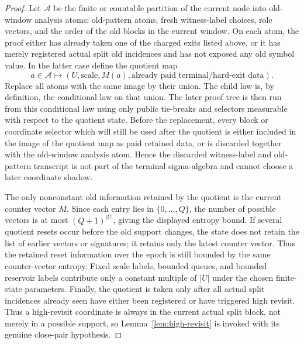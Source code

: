 \documentclass[11pt]{article}
\begin{document}
\begin{proof}
Let $\mathcal A$ be the finite or countable partition of the current node into
old-window analysis atoms: old-pattern atoms, fresh witness-label choices, role
vectors, and the order of the old blocks in the current window.  On each atom,
the proof either has already taken one of the charged exits listed above, or it
has merely registered actual split old incidences and has not exposed any old
symbol value.  In the latter case define the quotient map
\[
  a\in\mathcal A
  \longmapsto
  (U,\mathrm{scale},M(a),\text{already paid terminal/hard-exit data}).
\]
Replace all atoms with the same image by their union.  The child law is, by
definition, the conditional law on that union.  The later proof tree is then
run from this conditional law using only public tie-breaks and selectors
measurable with respect to the quotient state.  Before the replacement, every
block or coordinate selector which will still be used after the quotient is
either included in the image of the quotient map as paid retained data, or is
discarded together with the old-window analysis atom.  Hence the discarded
witness-label and old-pattern transcript is not part of the terminal
sigma-algebra and cannot choose a later coordinate shadow.

The only nonconstant old information retained by the quotient is the current
counter vector $M$.  Since each entry lies in $\{0,\ldots,Q\}$, the number of
possible vectors is at most $(Q+1)^{|U|}$, giving the displayed entropy bound.
If several quotient resets occur before the old support changes, the state does
not retain the list of earlier vectors or signatures; it retains only the
latest counter vector.  Thus the retained reset information over the epoch is
still bounded by the same counter-vector entropy.  Fixed scale labels, bounded
queues, and bounded reservoir labels contribute only a constant multiple of
$|U|$ under the chosen finite-state parameters.  Finally, the quotient is taken
only after all actual split incidences already seen have either been registered
or have triggered high revisit.  Thus a high-revisit coordinate is always in
the current actual split block, not merely in a possible support, so
Lemma~\ref{lem:high-revisit} is invoked with its genuine close-pair hypothesis.
\end{proof}
\end{document}
